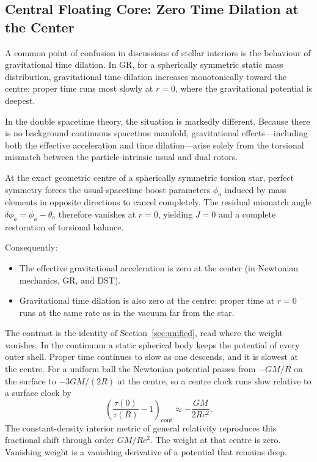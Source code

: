 \documentclass[a4paper]{article}
\begin{document}
\subsection{Central Floating Core: Zero Time Dilation at the Center}
\label{subsec:floating-core}

A common point of confusion in discussions of stellar interiors is the behaviour of gravitational time dilation. In GR, for a spherically symmetric static mass distribution, gravitational time dilation increases monotonically toward the centre: proper time runs most slowly at \(r=0\), where the gravitational potential is deepest.

In the double spacetime theory, the situation is markedly different. Because there is no background continuous spacetime manifold, gravitational effects—including both the effective acceleration and time dilation—arise solely from the torsional mismatch between the particle-intrinsic usual and dual rotors.

At the exact geometric centre of a spherically symmetric torsion star, perfect symmetry forces the usual-spacetime boost parameters \(\phi_a\) induced by mass elements in opposite directions to cancel completely. The residual mismatch angle \(\delta\phi_a = \phi_a - \theta_a\) therefore vanishes at \(r=0\), yielding \(J=0\) and a complete restoration of torsional balance.

Consequently:

\begin{itemize}
  \item The effective gravitational acceleration is zero at the center (in Newtonian mechanics, GR, and DST).
  \item Gravitational time dilation is also zero at the centre: proper time at \(r=0\) runs at the same rate as in the vacuum far from the star.
\end{itemize}

The contrast is the identity of Section~\ref{sec:unified}, read where the weight vanishes. In the continuum a static spherical body keeps the potential of every outer shell. Proper time continues to slow as one descends, and it is slowest at the centre. For a uniform ball the Newtonian potential passes from \(-GM/R\) on the surface to \(-3GM/(2R)\) at the centre, so a centre clock runs slow relative to a surface clock by
\begin{equation}
\label{eq:continuum-centre}
\left(\frac{\tau(0)}{\tau(R)}-1\right)_{\mathrm{cont}}
\approx -\frac{GM}{2Rc^{2}}.
\end{equation}
The constant-density interior metric of general relativity reproduces this fractional shift through order \(GM/Rc^{2}\). The weight at that centre is zero. Vanishing weight is a vanishing derivative of a potential that remains deep.
\end{document}
